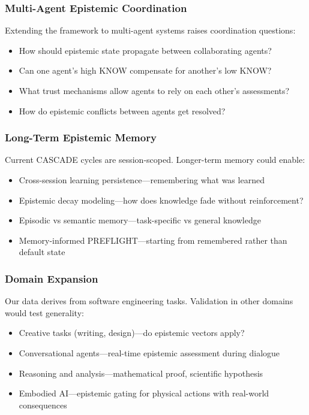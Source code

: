 \subsubsection{Multi-Agent Epistemic Coordination}

Extending the framework to multi-agent systems raises coordination questions:

\begin{itemize}
    \item How should epistemic state propagate between collaborating agents?
    \item Can one agent's high KNOW compensate for another's low KNOW?
    \item What trust mechanisms allow agents to rely on each other's assessments?
    \item How do epistemic conflicts between agents get resolved?
\end{itemize}

\subsubsection{Long-Term Epistemic Memory}

Current CASCADE cycles are session-scoped. Longer-term memory could enable:

\begin{itemize}
    \item Cross-session learning persistence---remembering what was learned
    \item Epistemic decay modeling---how does knowledge fade without reinforcement?
    \item Episodic vs semantic memory---task-specific vs general knowledge
    \item Memory-informed PREFLIGHT---starting from remembered rather than default state
\end{itemize}

\subsubsection{Domain Expansion}

Our data derives from software engineering tasks. Validation in other domains would test generality:

\begin{itemize}
    \item Creative tasks (writing, design)---do epistemic vectors apply?
    \item Conversational agents---real-time epistemic assessment during dialogue
    \item Reasoning and analysis---mathematical proof, scientific hypothesis
    \item Embodied AI---epistemic gating for physical actions with real-world consequences
\end{itemize}


